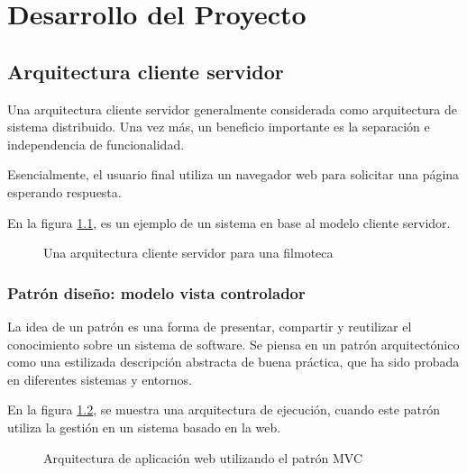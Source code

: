 \chapter{Desarrollo del Proyecto}

\section{Arquitectura cliente servidor}

Una arquitectura cliente servidor generalmente considerada como arquitectura
de sistema distribuido. Una vez más, un beneficio importante es la separación
e independencia de funcionalidad. \cite{sommerville2011software}

Esencialmente, el usuario final utiliza un navegador web para solicitar una
página esperando respuesta.

En la figura \ref{Una arquitectura cliente servidor para una filmoteca}, es un
ejemplo de un sistema en base al modelo cliente servidor. 
\cite{sommerville2011software}

\begin{figure}[!htb]
	\centering
	\caption{Una arquitectura cliente servidor para una filmoteca}
	\label{Una arquitectura cliente servidor para una filmoteca}
\end{figure}

\subsection{Patrón diseño: modelo vista controlador}

La idea de un patrón es una forma de presentar, compartir y reutilizar el
conocimiento sobre un sistema de software. Se piensa en un patrón
arquitectónico como una estilizada descripción abstracta de buena práctica,
que ha sido probada en diferentes sistemas y entornos. \cite{sommerville2011software}

En la figura \ref{fig:Arquitectura de aplicación web utilizando el patrón MVC},
se muestra una arquitectura de ejecución, cuando este patrón utiliza la
gestión en un sistema basado en la web. \cite{sommerville2011software}

\begin{figure}[ht]
\centering
	\caption{Arquitectura de aplicación web utilizando el patrón MVC}
	\label{fig:Arquitectura de aplicación web utilizando el patrón MVC}
\end{figure}


